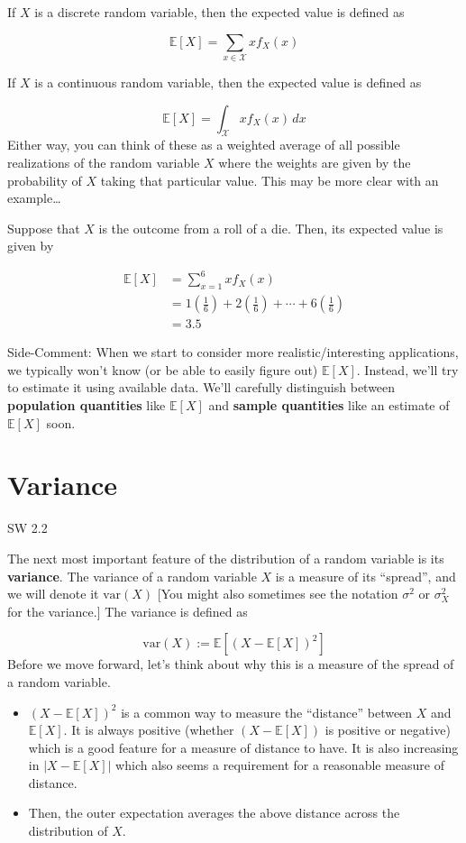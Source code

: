 \documentclass[
  letterpaper,
  DIV=11,
  numbers=noendperiod]{scrreprt}
\begin{document}
If \(X\) is a discrete random variable, then the expected value is
defined as

\[
  \mathbb{E}[X] = \sum_{x \in \mathcal{X}} x f_X(x)
\]

If \(X\) is a continuous random variable, then the expected value is
defined as

\[
  \mathbb{E}[X] = \int_{\mathcal{X}} x f_X(x) \, dx
\] Either way, you can think of these as a weighted average of all
possible realizations of the random variable \(X\) where the weights are
given by the probability of \(X\) taking that particular value. This may
be more clear with an example\ldots{}

Suppose that \(X\) is the outcome from a roll of a die. Then, its
expected value is given by

\[
  \begin{aligned}
  \mathbb{E}[X] &= \sum_{x=1}^6 x f_X(x) \\
  &= 1\left(\frac{1}{6}\right) + 2\left(\frac{1}{6}\right) + \cdots + 6\left(\frac{1}{6}\right) \\
  &= 3.5
  \end{aligned}
\]

{Side-Comment:} When we start to consider more realistic/interesting
applications, we typically won't know (or be able to easily figure out)
\(\mathbb{E}[X]\). Instead, we'll try to estimate it using available
data. We'll carefully distinguish between \textbf{population quantities}
like \(\mathbb{E}[X]\) and \textbf{sample quantities} like an estimate
of \(\mathbb{E}[X]\) soon.

\section{Variance}\label{variance}

SW 2.2

The next most important feature of the distribution of a random variable
is its \textbf{variance}. The variance of a random variable \(X\) is a
measure of its ``spread'', and we will denote it \(\mathrm{var}(X)\)
{[}You might also sometimes see the notation \(\sigma^2\) or
\(\sigma_X^2\) for the variance.{]} The variance is defined as

\[
  \mathrm{var}(X) := \mathbb{E}\left[ (X - \mathbb{E}[X])^2 \right]
\] Before we move forward, let's think about why this is a measure of
the spread of a random variable.

\begin{itemize}
\item
  \((X-\mathbb{E}[X])^2\) is a common way to measure the ``distance''
  between \(X\) and \(\mathbb{E}[X]\). It is always positive (whether
  \((X - \mathbb{E}[X])\) is positive or negative) which is a good
  feature for a measure of distance to have. It is also increasing in
  \(|X-\mathbb{E}[X]|\) which also seems a requirement for a reasonable
  measure of distance.
\item
  Then, the outer expectation averages the above distance across the
  distribution of \(X\).
\end{itemize}
\end{document}
